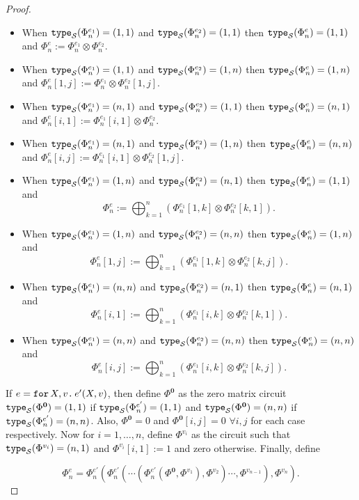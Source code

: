 \begin{proof}
\begin{itemize}
	\item When $\texttt{type}_{\mathcal{S}}(\Phi^{e_1}_n)=(1,1)$ and $\texttt{type}_{\mathcal{S}}(\Phi^{e_2}_n)=(1, 1)$ then $\texttt{type}_{\mathcal{S}}(\Phi^{e}_n)=(1, 1)$ and $\Phi^{e}_n:=\Phi^{e_1}_n \otimes \Phi^{e_2}_n$.
  \item When $\texttt{type}_{\mathcal{S}}(\Phi^{e_1}_n)=(1,1)$ and $\texttt{type}_{\mathcal{S}}(\Phi^{e_2}_n)=(1, n)$ then $\texttt{type}_{\mathcal{S}}(\Phi^{e}_n)=(1, n)$ and $\Phi^{e}_n[1,j]:=\Phi^{e_1}_n \otimes \Phi^{e_2}_n[1,j]$.
  \item When $\texttt{type}_{\mathcal{S}}(\Phi^{e_1}_n)=(n,1)$ and $\texttt{type}_{\mathcal{S}}(\Phi^{e_2}_n)=(1, 1)$ then $\texttt{type}_{\mathcal{S}}(\Phi^{e}_n)=(n, 1)$ and $\Phi^{e}_n[i,1]:=\Phi^{e_1}_n[i,1] \otimes \Phi^{e_2}_n$.
  \item When $\texttt{type}_{\mathcal{S}}(\Phi^{e_1}_n)=(n,1)$ and $\texttt{type}_{\mathcal{S}}(\Phi^{e_2}_n)=(1, n)$ then $\texttt{type}_{\mathcal{S}}(\Phi^{e}_n)=(n, n)$ and $\Phi^{e}_n[i,j]:=\Phi^{e_1}_n[i,1] \otimes \Phi^{e_2}_n[1,j]$.
  \item When $\texttt{type}_{\mathcal{S}}(\Phi^{e_1}_n)=(1,n)$ and $\texttt{type}_{\mathcal{S}}(\Phi^{e_2}_n)=(n, 1)$ then $\texttt{type}_{\mathcal{S}}(\Phi^{e}_n)=(1, 1)$ and $$\Phi^{e}_n:=\bigoplus_{k=1}^n \left( \Phi^{e_1}_n[1,k] \otimes \Phi^{e_2}_n[k,1] \right).$$
  \item When $\texttt{type}_{\mathcal{S}}(\Phi^{e_1}_n)=(1,n)$ and $\texttt{type}_{\mathcal{S}}(\Phi^{e_2}_n)=(n, n)$ then $\texttt{type}_{\mathcal{S}}(\Phi^{e}_n)=(1, n)$ and $$\Phi^{e}_n[1,j]:=\bigoplus_{k=1}^n \left( \Phi^{e_1}_n[1,k] \otimes \Phi^{e_2}_n[k,j] \right).$$
  \item When $\texttt{type}_{\mathcal{S}}(\Phi^{e_1}_n)=(n,n)$ and $\texttt{type}_{\mathcal{S}}(\Phi^{e_2}_n)=(n, 1)$ then $\texttt{type}_{\mathcal{S}}(\Phi^{e}_n)=(n, 1)$ and $$\Phi^{e}_n[i,1]:=\bigoplus_{k=1}^n \left( \Phi^{e_1}_n[i,k] \otimes \Phi^{e_2}_n[k,1] \right).$$
  \item When $\texttt{type}_{\mathcal{S}}(\Phi^{e_1}_n)=(n,n)$ and $\texttt{type}_{\mathcal{S}}(\Phi^{e_2}_n)=(n, n)$ then $\texttt{type}_{\mathcal{S}}(\Phi^{e}_n)=(n, n)$ and $$\Phi^{e}_n[i,j]:=\bigoplus_{k=1}^n \left( \Phi^{e_1}_n[i,k] \otimes \Phi^{e_2}_n[k,j] \right).$$
\end{itemize}

If $e=\texttt{for}\, X,v \texttt{.}\, e'(X, v)$, then define $\Phi^{\mathbf{0}}$ 
as the zero matrix circuit $\texttt{type}_{\mathcal{S}}(\Phi^{\mathbf{0}})=(1,1)$ if $\texttt{type}_{\mathcal{S}}(\Phi^{e'}_n)=(1,1)$ and 
$\texttt{type}_{\mathcal{S}}(\Phi^{\mathbf{0}})=(n,n)$ if $\texttt{type}_{\mathcal{S}}(\Phi^{e'}_n)=(n,n)$. Also, $\Phi^{\mathbf{0}}=0$ and
$\Phi^{\mathbf{0}}[i,j]=0$ $\forall i,j$ for each case respectively. Now for $i=1,\ldots, n$, define
$\Phi^{v_i}$ as the circuit such that $\texttt{type}_{\mathcal{S}}(\Phi^{v_i})=(n,1)$ and $\Phi^{v_i}[i,1]:=1$ and zero otherwise.
Finally, define

$$\Phi^{e}_n=\Phi^{e'}_n\left( \Phi^{e'}_n \left( \cdots \left( \Phi^{e'}_n\left( \Phi^{\mathbf{0}}, \Phi^{v_1}\right), \Phi^{v_2}\right)\cdots, \Phi^{v_{n-1}} \right), \Phi^{v_n} \right).$$


\end{proof}
